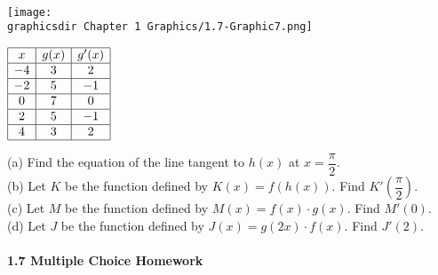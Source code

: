  \\
\begin{minipage}[t]{0.75\textwidth} \vspace{0pt}%
    \texttt{[image: \\graphicsdir Chapter 1 Graphics/1.7-Graphic7.png]}
\end{minipage} \hfill \begin{minipage}[t]{0.2\textwidth} \vspace{11pt}%
    \def\arraystretch{1.4}
    $\begin{array}{|c|c|c|}
        \hline
        x & g(x) & g'(x) \\ \hline
        -4 & 3 & 2 \\ \hline
        -2 & 5 & -1 \\ \hline
        0 & 7 & 0 \\ \hline
        2 & 5 & -1 \\ \hline
        4 & 3 & 2 \\
        \hline
    \end{array}$
\end{minipage} 

(a) Find the equation of the line tangent to $h(x)$ at $x = \dfrac{\pi}{2}$. \\[11pt]
(b) Let $K$ be the function defined by $K(x) = f(h(x))$. Find $K'\left(\dfrac{\pi}{2}\right)$. \\[11pt]
(c) Let $M$ be the function defined by $M(x) = f(x) \cdot g(x)$. Find $M'(0)$. \\[11pt]
(d) Let $J$ be the function defined by $J(x) = g(2x) \cdot f(x)$. Find $J'(2)$. \\[11pt]

 \\[11pt]

\textbf{\large{1.7 Multiple Choice Homework}} \par

